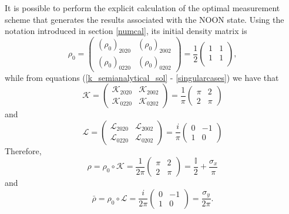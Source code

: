 It is possible to perform the explicit calculation of the optimal measurement scheme that generates the results associated with the NOON state. Using the notation introduced in section \ref{numcal}, its initial density matrix is
\begin{equation}
\rho_0 = 
\begin{pmatrix}
\left(\rho_0\right)_{2020} & \left(\rho_0\right)_{2002} \\
\left(\rho_0\right)_{0220} & \left(\rho_0\right)_{0202}
\end{pmatrix} = \frac{1}{2}
\begin{pmatrix}
1 & 1 \\
1 & 1 \\
\end{pmatrix},
\end{equation} 
while from equations (\ref{k_semianalytical_sol} - \ref{singularcases}) we have that
\begin{equation}
\mathcal{K} = 
\begin{pmatrix}
\mathcal{K}_{2020} & \mathcal{K}_{2002} \\
\mathcal{K}_{0220} & \mathcal{K}_{0202}
\end{pmatrix} = \frac{1}{\pi}
\begin{pmatrix}
\pi & 2 \\
2 & \pi
\end{pmatrix}
\end{equation}
and
\begin{equation}
\mathcal{L} = 
\begin{pmatrix}
\mathcal{L}_{2020} & \mathcal{L}_{2002} \\
\mathcal{L}_{0220} & \mathcal{L}_{0202}
\end{pmatrix} = \frac{i}{\pi}
\begin{pmatrix}
0 & -1 \\
1 & 0  
\end{pmatrix}
\end{equation}
Therefore, 
\begin{equation}
\rho = \rho_0 \circ \mathcal{K} = \frac{1}{2\pi}
\begin{pmatrix}
\pi & 2 \\
2 & \pi
\end{pmatrix} =
\frac{\mathbb{I}}{2} + \frac{\sigma_x}{\pi}
\label{rhonoon}
\end{equation}
and
\begin{equation}
\bar{\rho} = \rho_0 \circ \mathcal{L} = \frac{i}{2\pi}
\begin{pmatrix}
0 & -1 \\
1 & 0
\end{pmatrix} = \frac{\sigma_y}{2\pi}.
\label{rhobarnoon}
\end{equation}
